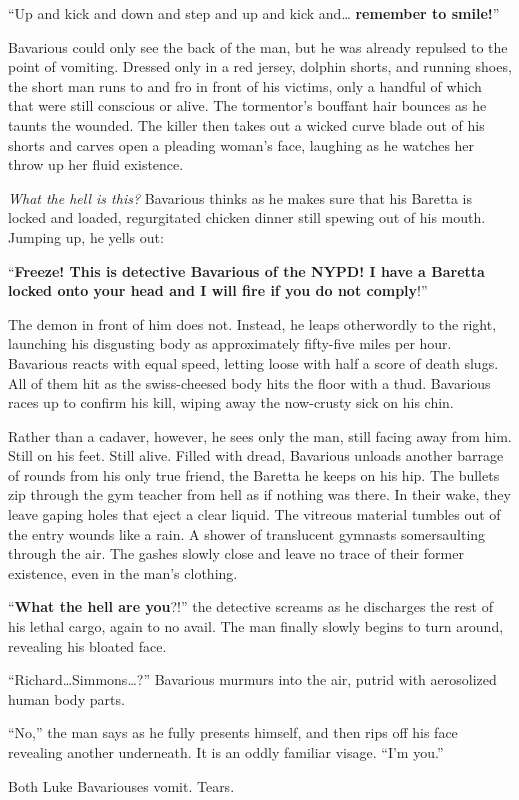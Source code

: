 ``Up and kick and down and step and up and kick
and{\ldots} {\bf remember to smile!}''



Bavarious could only see the back of the man, but he was already
repulsed to the point of vomiting. Dressed only in a red jersey,
dolphin shorts, and running shoes, the short man runs to and fro in
front of his victims, only a handful of which that were still
conscious or alive. The tormentor's bouffant hair bounces as
he taunts the wounded. The killer then takes out a wicked curve
blade out of his shorts and carves open a pleading woman's
face, laughing as he watches her throw up her fluid
existence.



{\em What the hell is this?} Bavarious thinks as he makes sure
that his Baretta is locked and loaded, regurgitated chicken dinner
still spewing out of his mouth. Jumping up, he yells out:



``{\bf Freeze! This is detective Bavarious of the NYPD! I have a
Baretta locked onto your head and I will fire if you do not
comply}!''



The demon in front of him does not. Instead, he leaps otherwordly
to the right, launching his disgusting body as approximately
fifty-five miles per hour. Bavarious reacts with equal speed,
letting loose with half a score of death slugs. All of them hit as
the swiss-cheesed body hits the floor with a thud. Bavarious races
up to confirm his kill, wiping away the now-crusty sick on his
chin.



Rather than a cadaver, however, he sees only the man, still facing
away from him. Still on his feet. Still alive. Filled with dread,
Bavarious unloads another barrage of rounds from his only true
friend, the Baretta he keeps on his hip. The bullets zip through
the gym teacher from hell as if nothing was there. In their wake,
they leave gaping holes that eject a clear liquid. The vitreous
material tumbles out of the entry wounds like a rain. A shower of
translucent gymnasts somersaulting through the air. The gashes
slowly close and leave no trace of their former existence, even in
the man's clothing.



``{\bf What the hell are you}?!'' the detective screams as he
discharges the rest of his lethal cargo, again to no avail. The man
finally slowly begins to turn around, revealing his bloated
face.



``Richard{\ldots}Simmons{\ldots}?'' Bavarious murmurs
into the air, putrid with aerosolized human body parts.



``No,'' the man says as he fully presents himself, and
then rips off his face revealing another underneath. It is an oddly
familiar visage. ``I'm you.''



Both Luke Bavariouses vomit. Tears.


 



